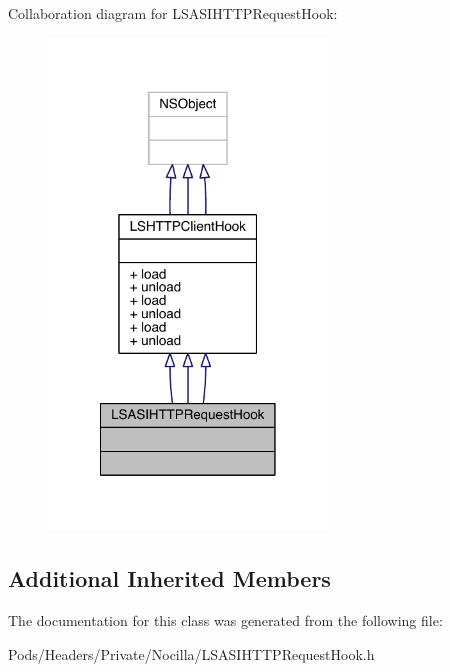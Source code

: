 Collaboration diagram for L\-S\-A\-S\-I\-H\-T\-T\-P\-Request\-Hook\-:\nopagebreak
\begin{figure}[H]
\begin{center}
\leavevmode
\includegraphics[width=210pt]{interface_l_s_a_s_i_h_t_t_p_request_hook__coll__graph}
\end{center}
\end{figure}
\subsection*{Additional Inherited Members}


The documentation for this class was generated from the following file\-:\begin{DoxyCompactItemize}
\item 
Pods/\-Headers/\-Private/\-Nocilla/L\-S\-A\-S\-I\-H\-T\-T\-P\-Request\-Hook.\-h\end{DoxyCompactItemize}
